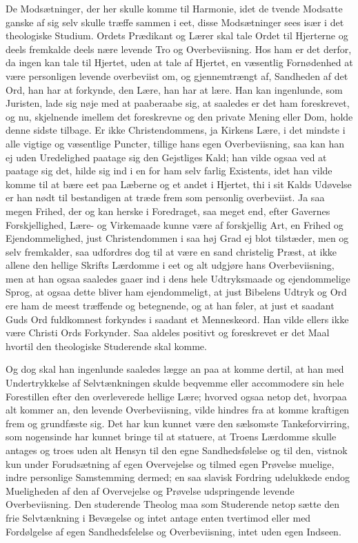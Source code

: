 \documentclass[12pt,a4paper]{book}
\newcommand{\apage}[1]{\marginnote{\footnotesize\textit{[#1]}}}
\begin{document}
De Modsætninger, der her skulle komme til Harmonie, idet de tvende Modsatte ganske
af sig selv skulle træffe sammen i eet, disse Modsætninger sees især i det
theologiske Studium. Ordets Prædikant og Lærer skal tale Ordet til Hjerterne og
deels fremkalde deels nære levende Tro og Overbeviisning. Hos ham er det derfor, da
ingen kan tale til Hjertet, uden at tale af Hjertet, en væsentlig Fornødenhed at
være personligen levende overbeviist om, og gjennemtrængt af, Sandheden af det
Ord, han har at forkynde, den Lære, han har at lære. Han kan ingenlunde, som
Juristen, lade sig nøje med at paaberaabe sig, at saaledes er det ham foreskrevet,
og nu, skjelnende imellem det foreskrevne og den private Mening eller Dom, holde
denne sidste tilbage. \apage{170}  Er ikke Christendommens, ja Kirkens Lære, i det mindste i
alle vigtige og væsentlige Puncter, tillige hans egen Overbeviisning, saa kan han
ej uden Uredelighed paatage sig den Gejstliges Kald; han vilde ogsaa ved at
paatage sig det, hilde sig ind i en for ham selv farlig Existents, idet han vilde
komme til at bære eet paa Læberne og et andet i Hjertet, thi i sit Kalds Udøvelse
er han nødt til bestandigen at træde frem som personlig overbeviist. Ja saa megen
Frihed, der og kan herske i Foredraget, saa meget end, efter Gavernes
Forskjellighed, Lære- og Virkemaade kunne være af forskjellig Art, en Frihed og
Ejendommelighed, just Christendommen i saa høj Grad ej blot tilstæder, men og selv
fremkalder, saa udfordres dog til at være en sand christelig Præst, at ikke allene
den hellige Skrifts Lærdomme i eet og alt udgjøre hans Overbeviisning, men at han
ogsaa saaledes gaaer ind i dens hele Udtryksmaade og ejendommelige Sprog, at ogsaa
dette bliver ham ejendommeligt, at just Bibelens Udtryk og Ord ere ham de meest
træffende og betegnende, og at han føler, at just et saadant Guds Ord fuldkomnest
forkyndes i saadant et Menneskeord. Han vilde ellers ikke være Christi Ords
Forkynder. Saa aldeles positivt og foreskrevet er det Maal hvortil den theologiske
Studerende skal komme.

Og dog skal han ingenlunde saaledes lægge an paa at komme dertil, at han med
Undertrykkelse \apage{171}  af Selvtænkningen skulde beqvemme eller accommodere sin hele
Forestillen efter den overleverede hellige Lære; hvorved ogsaa netop det, hvorpaa
alt kommer an, den levende Overbeviisning, vilde hindres fra at komme kraftigen
frem og grundfæste sig. Det har kun kunnet være den sælsomste Tankeforvirring, som nogensinde har kunnet
bringe til at statuere, at Troens Lærdomme skulle antages og troes uden alt Hensyn
til den egne Sandhedsfølelse og til den, vistnok kun under Forudsætning af egen
Overvejelse og tilmed egen Prøvelse muelige, indre personlige Samstemming dermed;
en saa slavisk Fordring udelukkede endog Mueligheden af den af Overvejelse og
Prøvelse udspringende levende Overbeviisning. Den studerende Theolog maa som
Studerende netop sætte den frie Selvtænkning i Bevægelse og intet antage enten
tvertimod eller med Fordølgelse af egen Sandhedsfelelse%
 og Overbeviisning, intet uden egen Indseen.
\end{document}
